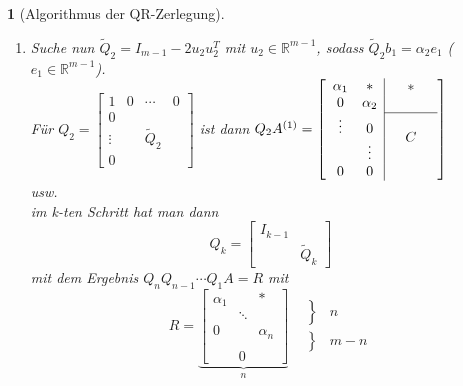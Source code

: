 \documentclass[12pt]{article}
\theoremstyle{break}
\newtheorem{nothing}[theorem]{}
\begin{document}
\begin{nothing}[Algorithmus der QR-Zerlegung]
\begin{enumerate}
  \item Suche nun $\tilde{Q}_2 = I_{m-1} - 2 u_2 u_2^T$ mit $u_2 \in \mathbb{R}^{m-1}$, sodass $\tilde{Q}_2 b_1 = \alpha_2 e_1$ ($e_1 \in \mathbb{R}^{m-1}$).\\
  Für $Q_2 = \left[ \begin{matrix} 1 & 0 & \cdots & 0 \\ 0 \\ \vdots & & \tilde{Q}_2 \\0 \end{matrix} \right]$ ist dann $Q_2A^{(1)} = \left[ \begin{array}{cc|} \alpha_1 & *  \\ 0 & \alpha_2 \\ \vdots & 0 \\ & \vdots \\ 0 & 0 \end{array} \begin{array}{ccc} &* \\ \\ \hline \\  &C &\\ \\ \\ \end{array}\right]$\\
  usw.\\
  im k-ten Schritt hat man dann
  $$Q_k = \left[ \begin{matrix} I_{k-1} \\ & \tilde{Q}_k \end{matrix} \right]$$
  mit dem Ergebnis $Q_n Q_{n-1} \cdots Q_1 A = R$ mit 
  $$R = \underbrace{\left[ \begin{matrix} \alpha_1 & & * \\ & \ddots \\ 0 && \alpha_n \\ \\ & 0 \end{matrix} \right]}_n\begin{matrix} \left. \begin{matrix} \\\\\\\end{matrix} \right\} &n \\ \left. \begin{matrix} \\\\\end{matrix} \right\} & m-n\end{matrix}$$
\end{enumerate}
\end{nothing}
\end{document}
